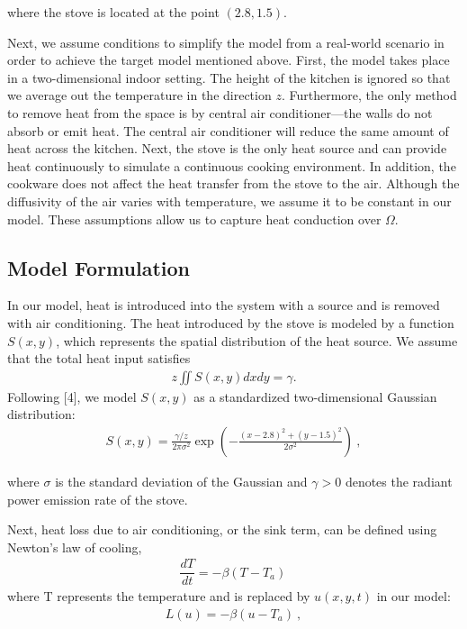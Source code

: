 \documentclass{article}
\begin{document}
\noindent where the stove is located at the point $(2.8, 1.5)$.

\vspace{3mm}

\noindent Next, we assume conditions to simplify the model from a real-world scenario in order to achieve the target model mentioned above. First, the model takes place in a two-dimensional indoor setting. The height of the kitchen is ignored so that we average out the temperature in the direction $z$. Furthermore, the only method to remove heat from the space is by central air conditioner---the walls do not absorb or emit heat. The central air conditioner will reduce the same amount of heat across the kitchen. Next, the stove is the only heat source and can provide heat continuously to simulate a continuous cooking environment. In addition, the cookware does not affect the heat transfer from the stove to the air. Although the diffusivity of the air varies with temperature, we assume it to be constant in our model. These assumptions allow us to capture heat conduction over $\Omega$. 

\subsection{Model Formulation}
In our model, heat is introduced into the system with a source and is removed with air conditioning. The heat introduced by the stove is modeled by a function $S(x, y)$, which represents the spatial distribution of the heat source. We assume that the total heat input satisfies
\begin{align*}
z\displaystyle\iint S(x, y) dxdy = \gamma. 
\end{align*}
Following [4], we model $S(x, y)$ as a standardized two-dimensional Gaussian distribution:
\begin{align*}
    S(x, y) = \frac{\gamma/z}{2\pi\sigma^2}\exp\left(-\frac{(x-2.8)^2 + (y-1.5)^2}{2\sigma^2}\right) \ ,
\end{align*}

\noindent where $\sigma$ is the standard deviation of the Gaussian and $\gamma > 0$ denotes the radiant power emission rate of the stove. 

\vspace{3mm}

\noindent Next, heat loss due to air conditioning, or the sink term, can be defined using Newton’s law of cooling,
\begin{align*}
\dfrac{dT}{dt} = -\beta(T - T_a) \, 
\end{align*}
where T represents the temperature and is replaced by $u(x,y,t)$ in our model: 
\begin{align*}
    L(u) = -\beta(u - T_a) \ ,
\end{align*}
\end{document}
